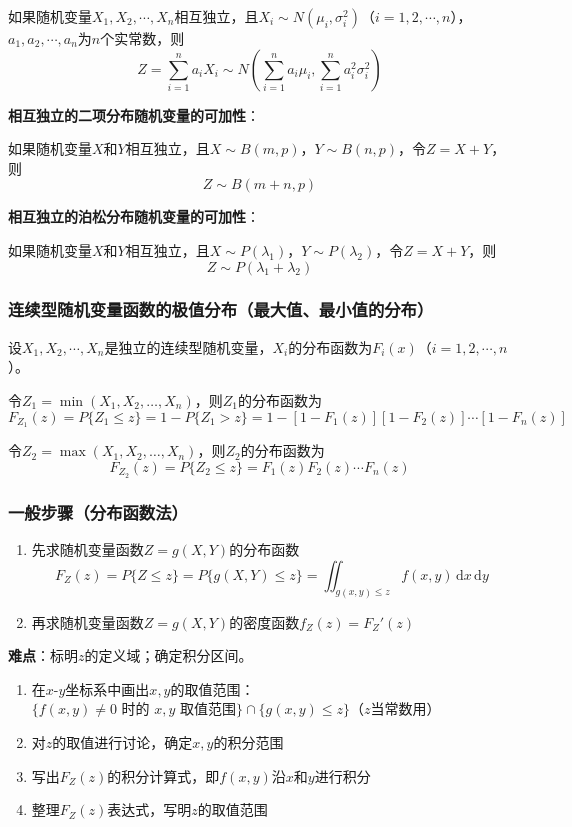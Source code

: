 \documentclass[11pt,a4paper]{report}
\theoremstyle{definition}
\theoremstyle{plain}
\begin{document}
如果随机变量\(X_1,X_2,\cdots,X_n\)相互独立，且\(X_i\sim N(\mu_i,\sigma_i^2)\)（\(i=1,2,\cdots,n\)），\(a_1,a_2,\cdots,a_n\)为\(n\)个实常数，则
\[
Z=\sum_{i=1}^{n}a_iX_i\sim N\left(\sum_{i=1}^{n}a_i\mu_i,\sum_{i=1}^{n}a_i^2\sigma_i^2\right)
\]

\textbf{相互独立的二项分布随机变量的可加性}：

如果随机变量\(X\)和\(Y\)相互独立，且\(X\sim B(m,p)\)，\(Y\sim B(n,p)\)，令\(Z=X+Y\)，则
\[
Z\sim B(m+n,p)
\]

\textbf{相互独立的泊松分布随机变量的可加性}：

如果随机变量\(X\)和\(Y\)相互独立，且\(X\sim P(\lambda_1)\)，\(Y\sim P(\lambda_2)\)，令\(Z=X+Y\)，则
\[
Z\sim P(\lambda_1+\lambda_2)
\]

\subsubsection{连续型随机变量函数的极值分布（最大值、最小值的分布）}

设\(X_1,X_2,\cdots,X_n\)是独立的连续型随机变量，\(X_i\)的分布函数为\(F_i(x)\)（\(i=1,2,\cdots,n\)）。

令\(Z_1=\min(X_1,X_2,\ldots,X_n)\)，则\(Z_1\)的分布函数为
\[
F_{Z_1}(z)=P\{Z_1\leq z\}=1-P\{Z_1>z\}=1-[1-F_1(z)][1-F_2(z)]\cdots[1-F_n(z)]
\]

令\(Z_2=\max(X_1,X_2,\ldots,X_n)\)，则\(Z_2\)的分布函数为
\[
F_{Z_2}(z)=P\{Z_2\leq z\}=F_1(z)F_2(z)\cdots F_n(z)
\]

\subsubsection{一般步骤（分布函数法）}

\begin{enumerate}[label=\arabic*.,leftmargin=2em]
    \item 先求随机变量函数\(Z=g(X,Y)\)的分布函数
    \[
    F_Z(z)=P\{Z\leq z\}=P\{g(X,Y)\leq z\}=\iint_{g(x,y)\leq z}f(x,y)\,\mathrm{d}x\,\mathrm{d}y
    \]
    \item 再求随机变量函数\(Z=g(X,Y)\)的密度函数\(f_Z(z)=F_Z'(z)\)
\end{enumerate}

\textbf{难点}：标明\(z\)的定义域；确定积分区间。

\begin{enumerate}[label=\arabic*.,leftmargin=2em]
    \item 在\(x\)-\(y\)坐标系中画出\(x,y\)的取值范围：\(\{f(x,y)\neq 0\text{ 时的 }x,y\text{ 取值范围}\}\cap\{g(x,y)\leq z\}\)（\(z\)当常数用）
    \item 对\(z\)的取值进行讨论，确定\(x,y\)的积分范围
    \item 写出\(F_Z(z)\)的积分计算式，即\(f(x,y)\)沿\(x\)和\(y\)进行积分
    \item 整理\(F_Z(z)\)表达式，写明\(z\)的取值范围
\end{enumerate}
\end{document}
